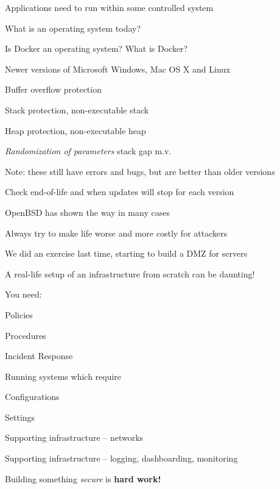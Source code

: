 \documentclass[Screen16to9,17pt]{foils}
\begin{document}


\begin{list2}
\item Applications need to run within some controlled system
\item What is an operating system today?
\item Is Docker an operating system? What is Docker?
\end{list2}




\begin{list1}
\item Newer versions of Microsoft Windows, Mac OS X and Linux
\begin{list2}
\item Buffer overflow protection
\item Stack protection, non-executable stack
\item Heap protection, non-executable heap
\item \emph{Randomization of parameters} stack gap m.v.
\end{list2}
\item Note: these still have errors and bugs, but are better than older versions
\item Check end-of-life and when updates will stop for each version
\item OpenBSD has shown the way in many cases\\ 
\end{list1}

\vskip 1cm

\centerline{Always try to make life worse and more costly for attackers}




\begin{list1}
\item We did an exercise last time, starting to build a DMZ for servers
\item A real-life setup of an infrastructure from scratch can be daunting!
\item You need:
\begin{list2}
\item Policies
\item Procedures
\item Incident Response
\end{list2}
\item Running systems which require
\begin{list2}
\item Configurations
\item Settings
\item Supporting infrastructure -- networks
\item Supporting infrastructure -- logging, dashboarding, monitoring
\end{list2}
\item Building something \emph{secure} is {\bf hard work!}
\end{list1}
\end{document}
